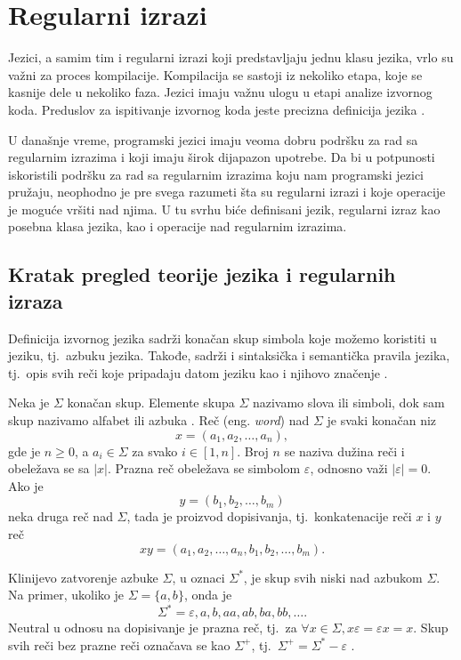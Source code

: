 \documentclass[12pt,oneside]{memoir}
\theoremstyle{plain}
\theoremstyle{definition}
\begin{document}
\chapter{Regularni izrazi}

Jezici, a samim tim i regularni izrazi koji predstavljaju jednu klasu jezika, vrlo su važni za proces kompilacije. Kompilacija se sastoji iz nekoliko etapa, koje se kasnije dele u nekoliko faza. Jezici imaju važnu ulogu u etapi analize izvornog koda. Preduslov za ispitivanje izvornog koda jeste precizna definicija jezika \cite{Vitas}.

U današnje vreme, programski jezici imaju veoma dobru podršku za rad sa regularnim izrazima i koji imaju širok dijapazon upotrebe. Da bi u potpunosti iskoristili podršku za rad sa regularnim izrazima koju nam programski jezici pružaju, neophodno je pre svega razumeti šta su regularni izrazi i koje operacije je moguće vršiti nad njima. U tu svrhu biće definisani jezik, regularni izraz kao posebna klasa jezika, kao i operacije nad regularnim izrazima. 

\section{Kratak pregled teorije jezika i regularnih izraza} 

Definicija izvornog jezika sadrži konačan skup simbola koje možemo koristiti u jeziku, tj.~azbuku jezika. Takođe, sadrži i sintaksička i semantička pravila jezika, tj.~opis svih reči koje pripadaju datom jeziku kao i njihovo značenje \cite{Vitas}.

Neka je $\Sigma$ konačan skup. Elemente skupa $\Sigma$ nazivamo slova ili simboli, dok sam skup nazivamo alfabet ili azbuka \cite{Vitas}. Reč (eng. \textit{word}) nad $\Sigma$ je svaki konačan niz $$x = (a_1, a_2, …, a_n),$$ gde je $n \geq 0$, a $a_i \in \Sigma$ za svako $\textit{i} \in [1,n]$. Broj $n$ se naziva dužina reči i obeležava se sa $|x|$. Prazna reč  obeležava se simbolom $\varepsilon$, odnosno važi $| \varepsilon |=0$. Ako je $$y = (b_1, b_2, …, b_m)$$ neka druga reč nad $\Sigma$, tada je proizvod dopisivanja, tj.~konkatenacije reči $x$ i $y$ reč $$xy =(a_1, a_2, …, a_n, b_1, b_2, …, b_m).$$


Klinijevo zatvorenje azbuke $\Sigma$, u oznaci $\Sigma^*$, je skup svih niski nad azbukom $\Sigma$. Na primer, ukoliko je $\Sigma = \{a,b\}$, onda je $$\Sigma^* = { \varepsilon, a, b, aa, ab, ba, bb, …}.$$
Neutral u odnosu na dopisivanje je prazna reč, tj.~za $\forall x\in \Sigma, x\varepsilon = \varepsilon x = x$. Skup svih reči bez prazne reči označava se kao $\Sigma^+$, tj.~$\Sigma^+ = \Sigma^* - { \varepsilon }$ \cite{Vitas}. 
\end{document}
